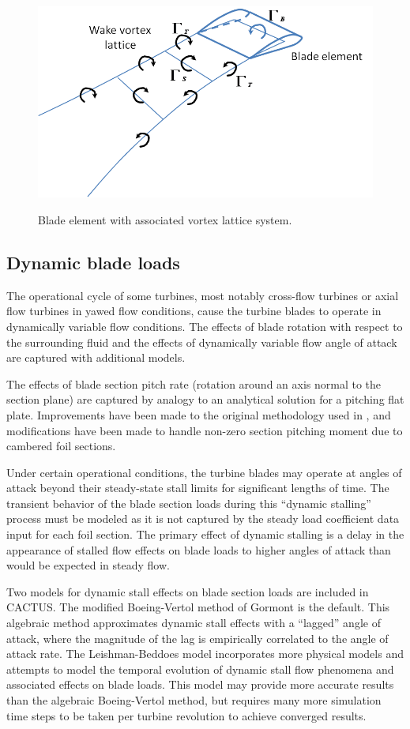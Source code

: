 \begin{figure}
\includegraphics{figures/vortex_lattice.png}
\label{fig:vortex_lattice}
\caption{Blade element with associated vortex lattice system.}
\end{figure}

\subsection{Dynamic blade loads}
The operational cycle of some turbines, most notably cross-flow turbines or axial flow turbines in yawed flow conditions, cause the turbine blades to operate in dynamically variable flow conditions. The effects of blade rotation with respect to the surrounding fluid and the effects of dynamically variable flow angle of attack are captured with additional models.

The effects of blade section pitch rate (rotation around an axis normal to the section plane) are captured by analogy to an analytical solution for a pitching flat plate. Improvements have been made to the original methodology used in , and modifications have been made to handle non-zero section pitching moment due to cambered foil sections.

Under certain operational conditions, the turbine blades may operate at angles of attack beyond their steady-state stall limits for significant lengths of time. The transient behavior of the blade section loads during this ``dynamic stalling'' process must be modeled as it is not captured by the steady load coefficient data input for each foil section. The primary effect of dynamic stalling is a delay in the appearance of stalled flow effects on blade loads to higher angles of attack than would be expected in steady flow.

Two models for dynamic stall effects on blade section loads are included in CACTUS. The modified Boeing-Vertol method of Gormont is the default. This algebraic method approximates dynamic stall effects with a ``lagged'' angle of attack, where the magnitude of the lag is empirically correlated to the angle of attack rate. The Leishman-Beddoes model incorporates more physical models and attempts to model the temporal evolution of dynamic stall flow phenomena and associated effects on blade loads. This model may provide more accurate results than the algebraic Boeing-Vertol method, but requires many more simulation time steps to be taken per turbine revolution to achieve converged results.


